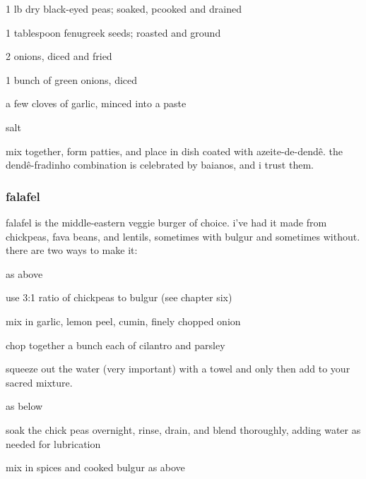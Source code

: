 \begin{ingredients}
  \item 1 lb dry black-eyed peas; soaked, pcooked and drained
  \item 1 tablespoon fenugreek seeds; roasted and ground
  \item 2 onions, diced and fried
  \item 1 bunch of green onions, diced
  \item a few cloves of garlic, minced into a paste
  \item salt
\end{ingredients}

mix together, form patties, and place in dish coated with azeite-de-dend\^{e}. 
the dend\^{e}-fradinho combination is celebrated by baianos, and i trust them.

\subsubsection{falafel}

falafel is the middle-eastern veggie burger of choice. i've had it made from 
chickpeas, fava beans, and lentils, sometimes with bulgur and sometimes 
without. there are two ways to make it:

\begin{algorithm}
  \item as above
  \begin{ingredients}
    \item use 3:1 ratio of chickpeas to bulgur (see chapter six)
    \item mix in garlic, lemon peel, cumin, finely chopped onion
    \item chop together a bunch each of cilantro and parsley
    \item squeeze out the water (very important) with a towel and only then add to your sacred mixture.
  \end{ingredients}
  	
  \item as below
  \begin{ingredients}
    \item soak the chick peas overnight, rinse, drain, and blend thoroughly, adding water as needed for lubrication
    \item mix in spices and cooked bulgur as above
  \end{ingredients}

\end{algorithm}

